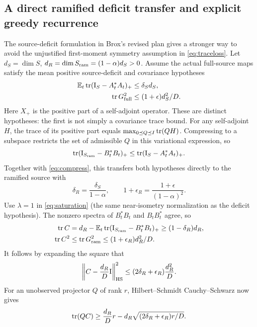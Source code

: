 \documentclass[11pt,a4paper]{article}
\begin{document}
\subsection{A direct ramified deficit transfer and explicit greedy recurrence}
The source-deficit formulation in Brox's revised plan \cite{broxplan} gives a stronger way to avoid the unjustified first-moment symmetry assumption in \eqref{eq:traceloss}. Let $d_S=\dim S$, $d_R=\dim S_{\rm ram}=(1-\alpha)d_S>0$. Assume the actual full-source maps satisfy the mean positive source-deficit and covariance hypotheses
\begin{align}
\mathbb E_t\operatorname{tr}(\mathrm I_S-A_t^*A_t)_+&\leq\delta_S d_S,\\
\operatorname{tr} G_{\rm full}^2&\leq(1+\epsilon)d_S^2/D.
\end{align}
Here $X_+$ is the positive part of a self-adjoint operator. These are distinct hypotheses: the first is not simply a covariance trace bound. For any self-adjoint $H$, the trace of its positive part equals $\max_{0\preceq Q\preceq I}\operatorname{tr}(QH)$. Compressing to a subspace restricts the set of admissible $Q$ in this variational expression, so
\begin{equation}
\operatorname{tr}(\mathrm I_{S_{\rm ram}}-B_t^*B_t)_+\leq\operatorname{tr}(\mathrm I_S-A_t^*A_t)_+.
\end{equation}
Together with \eqref{eq:compress}, this transfers both hypotheses directly to the ramified source with
\begin{equation}
\delta_R=\frac{\delta_S}{1-\alpha},\qquad 1+\epsilon_R=\frac{1+\epsilon}{(1-\alpha)^2}.
\end{equation}
Use $\lambda=1$ in \eqref{eq:saturation} (the same near-isometry normalization as the deficit hypothesis). The nonzero spectra of $B_t^*B_t$ and $B_tB_t^*$ agree, so
\begin{align}
\operatorname{tr} C&=d_R-\mathbb E_t\operatorname{tr}(\mathrm I_{S_{\rm ram}}-B_t^*B_t)_+\geq(1-\delta_R)d_R,\\
\operatorname{tr} C^2&\leq\operatorname{tr} G_{\rm ram}^2\leq(1+\epsilon_R)d_R^2/D.
\end{align}
It follows by expanding the square that
\begin{equation}
\left\|C-\frac{d_R}{D}\mathrm I\right\|_{\rm HS}^2
\leq(2\delta_R+\epsilon_R)\frac{d_R^2}{D}.
\end{equation}
For an unobserved projector $Q$ of rank $r$, Hilbert--Schmidt Cauchy--Schwarz now gives
\begin{equation}\label{eq:directram}
\operatorname{tr}(QC)\geq\frac{d_R}{D}r-d_R\sqrt{(2\delta_R+\epsilon_R)r/D}.
\end{equation}
\end{document}
